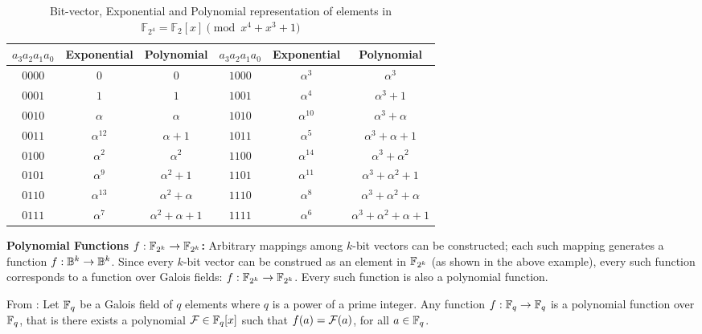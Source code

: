 \begin{Example}
\vspace{-0.1in}
\begin{table}[h]
\begin{center}
{\small
\caption{Bit-vector, Exponential and Polynomial representation of
elements in  ${\mathbb{F}}_{2^4} = {\mathbb{F}}_2[x]
\pmod{x^4+x^3+1}$}\label{tab:gfelement}  
\begin{tabular}{|c|c|c||c|c|c|} 
\hline
$a_3a_2a_1a_0$ & Exponential & Polynomial     &$a_3a_2a_1a_0$ & Exponential & Polynomial  \\
\hline
$0000$        & $0$         & $0$            & $1000$ & $\alpha^3$ &  $\alpha^3$\\
\hline
$0001$        & $1$         & $1$            & $1001$ & $\alpha^4$ & $\alpha^3 + 1$\\
\hline
$0010$        & $\alpha$    & $\alpha$       & $1010$ & $\alpha^{10}$&$\alpha^3 + \alpha$  \\
\hline
$0011$        & $\alpha^{12}$& $\alpha + 1$   & $1011$ & $\alpha^5$ & $\alpha^3+\alpha+1$\\
\hline
$0100$        & $\alpha^2$  & $\alpha^2$     &  $1100$ & $\alpha^{14}$ & $\alpha^3 + \alpha^2$\\
\hline
$0101$        & $\alpha^9$   &$\alpha^2 + 1$ & $1101$  &$\alpha^{11}$  & $\alpha^3+\alpha^2+1$\\
\hline
$0110$        & $\alpha^{13}$& $\alpha^2 + \alpha$ & $1110$ & $\alpha^8$& $\alpha^3+\alpha^2+\alpha$\\
\hline
$0111$        &$\alpha^7 $ & $\alpha^2+\alpha+1$ & $1111$ &$\alpha^6$ & $\alpha^3+\alpha^2+\alpha+1$\\
\hline
\end{tabular}
}
\end{center}
\end{table}
\end{Example}




{\bf Polynomial Functions $f: {\mathbb{F}}_{2^k} \rightarrow {\mathbb{F}}_{2^k}$:} 
Arbitrary mappings among $k$-bit vectors can be constructed; each such
mapping generates a function $f: {\mathbb{B}}^k \rightarrow {\mathbb{B}}^k$. Since every
$k$-bit vector can be construed as an element in ${\mathbb{F}}_{2^k}$ (as shown in
the above example), every such function corresponds to a function over
Galois fields: $f: {\mathbb{F}}_{2^k} \rightarrow {\mathbb{F}}_{2^k}$. Every such function is also
a polynomial function. 

\begin{Theorem}
From \cite{ff:1997}: 
Let ${\mathbb{F}}_{q}$ be a Galois field of $q$ elements where $q$ is a power of a
prime integer. Any  function $f: {\mathbb{F}}_{q} \to {\mathbb{F}}_{q}$ is a polynomial function
over ${\mathbb{F}}_{q}$, that is there exists a polynomial ${\mathcal{F}} \in {\mathbb{F}}_{q} [x]$ such
  that $f(a) = {\mathcal{F}}(a)$, for all $a \in {\mathbb{F}}_{q}$. 
\end{Theorem}

